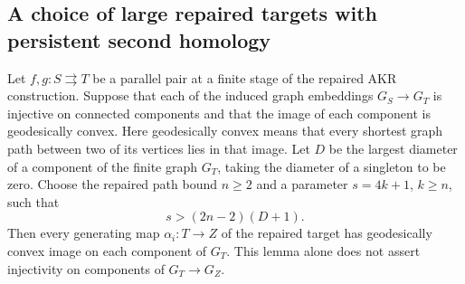 \subsection{A choice of large repaired targets with persistent second homology}

\begin{lemma}
\label{C:large-target-convexity}
Let $f,g:S\rightrightarrows T$ be a parallel pair at a finite stage of
the repaired AKR construction. Suppose that each of the induced graph
embeddings $G_S\to G_T$ is injective on connected components and that
the image of each component is geodesically convex. Here geodesically
convex means that every shortest graph path between two of its
vertices lies in that image. Let $D$ be the largest diameter of a
component of the finite graph $G_T$, taking the diameter of a singleton
to be zero. Choose the repaired path bound $n\geq2$ and a parameter
$s=4k+1$, $k\geq n$, such that
\[
 s>(2n-2)(D+1).
 \tag{LC}\label{eq:akr-large-convexity-bound}
\]
Then every generating map $\alpha_i:T\to Z$ of the repaired target
has geodesically convex image on each component of $G_T$.
This lemma alone does not assert injectivity on components of
$G_T\to G_Z$.
\end{lemma}

